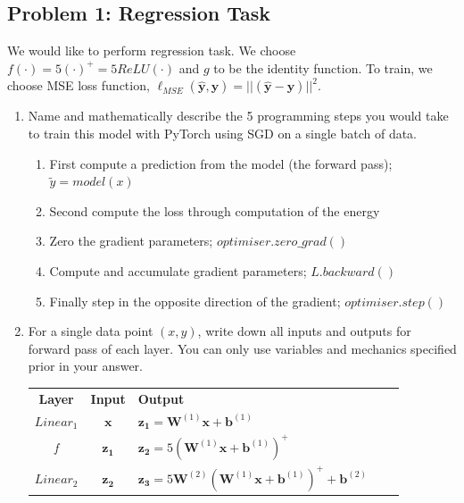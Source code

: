 \documentclass{article}
\begin{document}
\subsection*{Problem 1: Regression Task}
We would like to perform regression task. We choose
$f(\cdot)=5(\cdot)^{+}=5ReLU(\cdot)$ and $g$ to be the identity function. To
train, we choose MSE loss function,
$\ell_{MSE}(\bm{\hat{y}},\bm{y})=||(\bm{\hat{y}}-\bm{y})||^2$.
\begin{enumerate}
  \item Name and mathematically describe the 5 programming steps you
        would take to train this model with PyTorch using SGD on a single batch
        of data.
        \begin{tcolorbox}
          \begin{enumerate}
            \item First compute a prediction from the model (the forward pass); $\tilde{y}=model(x)$
            \item Second compute the loss through computation of the energy
            \item Zero the gradient parameters; $optimiser.zero\_grad()$
            \item Compute and accumulate gradient parameters; $L.backward()$
            \item Finally step in the opposite direction of the gradient; $optimiser.step()$
          \end{enumerate}
        \end{tcolorbox}
  \item For a single data point $(x,y)$, write down all inputs and outputs for
        forward pass of each layer. You can only use variables and mechanics specified
        prior in your answer.
        \begin{table}[]
          \begin{tcolorbox}
            \centering
            \begin{tabular}{|c|c|l|cc}
              \cline{1-3}
              \textbf{Layer}   & \textbf{Input} & \textbf{Output} &  &  \\ \cline{1-3}
              \textit{$Linear_1$} & $\bm{x}$              & $\bm{z_1}=\bm{W}^{(1)}\bm{x}+\bm{b}^{(1)}$               &  &  \\ \cline{1-3}
              \textit{f}       & $\bm{z_1}$              & $\bm{z_2}=5(\bm{W}^{(1)}\bm{x}+\bm{b}^{(1)})^+$               &  &  \\ \cline{1-3}
              \textit{$Linear_2$} & $\bm{z_2}$             & $\bm{z_3}=5\bm{W}^{(2)}(\bm{W}^{(1)}\bm{x}+\bm{b}^{(1)})^++\bm{b}^{(2)}$               &  &  \\ \cline{1-3}

\end{tabular}
\end{tcolorbox}
\end{table}
\end{enumerate}
\end{document}
